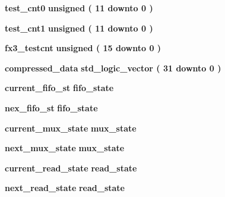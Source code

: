 \begin{DoxyCompactItemize}
\item 
{\bf test\+\_\+cnt0} {\bfseries \textcolor{comment}{unsigned}\textcolor{vhdlchar}{ }\textcolor{vhdlchar}{(}\textcolor{vhdlchar}{ }\textcolor{vhdlchar}{ } \textcolor{vhdldigit}{11} \textcolor{vhdlchar}{ }\textcolor{keywordflow}{downto}\textcolor{vhdlchar}{ }\textcolor{vhdlchar}{ } \textcolor{vhdldigit}{0} \textcolor{vhdlchar}{ }\textcolor{vhdlchar}{)}\textcolor{vhdlchar}{ }} 
\item 
{\bf test\+\_\+cnt1} {\bfseries \textcolor{comment}{unsigned}\textcolor{vhdlchar}{ }\textcolor{vhdlchar}{(}\textcolor{vhdlchar}{ }\textcolor{vhdlchar}{ } \textcolor{vhdldigit}{11} \textcolor{vhdlchar}{ }\textcolor{keywordflow}{downto}\textcolor{vhdlchar}{ }\textcolor{vhdlchar}{ } \textcolor{vhdldigit}{0} \textcolor{vhdlchar}{ }\textcolor{vhdlchar}{)}\textcolor{vhdlchar}{ }} 
\item 
{\bf fx3\+\_\+testcnt} {\bfseries \textcolor{comment}{unsigned}\textcolor{vhdlchar}{ }\textcolor{vhdlchar}{(}\textcolor{vhdlchar}{ }\textcolor{vhdlchar}{ } \textcolor{vhdldigit}{15} \textcolor{vhdlchar}{ }\textcolor{keywordflow}{downto}\textcolor{vhdlchar}{ }\textcolor{vhdlchar}{ } \textcolor{vhdldigit}{0} \textcolor{vhdlchar}{ }\textcolor{vhdlchar}{)}\textcolor{vhdlchar}{ }} 
\item 
{\bf compressed\+\_\+data} {\bfseries \textcolor{comment}{std\+\_\+logic\+\_\+vector}\textcolor{vhdlchar}{ }\textcolor{vhdlchar}{(}\textcolor{vhdlchar}{ }\textcolor{vhdlchar}{ } \textcolor{vhdldigit}{31} \textcolor{vhdlchar}{ }\textcolor{keywordflow}{downto}\textcolor{vhdlchar}{ }\textcolor{vhdlchar}{ } \textcolor{vhdldigit}{0} \textcolor{vhdlchar}{ }\textcolor{vhdlchar}{)}\textcolor{vhdlchar}{ }} 
\item 
{\bf current\+\_\+fifo\+\_\+st} {\bfseries {\bfseries {\bf fifo\+\_\+state}} \textcolor{vhdlchar}{ }} 
\item 
{\bf nex\+\_\+fifo\+\_\+st} {\bfseries {\bfseries {\bf fifo\+\_\+state}} \textcolor{vhdlchar}{ }} 
\item 
{\bf current\+\_\+mux\+\_\+state} {\bfseries {\bfseries {\bf mux\+\_\+state}} \textcolor{vhdlchar}{ }} 
\item 
{\bf next\+\_\+mux\+\_\+state} {\bfseries {\bfseries {\bf mux\+\_\+state}} \textcolor{vhdlchar}{ }} 
\item 
{\bf current\+\_\+read\+\_\+state} {\bfseries {\bfseries {\bf read\+\_\+state}} \textcolor{vhdlchar}{ }} 
\item 
{\bf next\+\_\+read\+\_\+state} {\bfseries {\bfseries {\bf read\+\_\+state}} \textcolor{vhdlchar}{ }} 

\end{DoxyCompactItemize}
